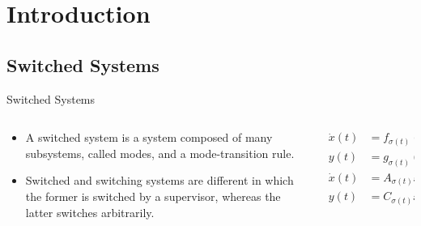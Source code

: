 
\section{Introduction}%
\label{sec:introduction}

\subsection{Switched Systems}%
\label{subsec:switched-systems}

\begin{slide}{Switched Systems}
  \begin{columns}[c]
    \begin{column}{0.48\textwidth}
      \begin{itemize}
        \item A switched system is a system composed of many subsystems, called
              modes, and a mode-transition rule.
        \item Switched and switching systems are different in which the former
              is switched by a supervisor, whereas the latter switches
              arbitrarily.
      \end{itemize}
    \end{column}%
    \hfill%
    \begin{column}{0.48\textwidth}
      \begin{equation}
        \begin{aligned}
          \dot{x}(t) & = f_{\sigma(t)}(t,x(t),u(t)), \\
          y(t)       & = g_{\sigma(t)}(t,x(t)),
        \end{aligned}
      \end{equation}
      \vspace*{0.5cm}
      \begin{equation}
        \begin{aligned}
          \dot{x}(t) & = A_{\sigma(t)}x(t) + B_{\sigma(t)}u(t), \\
          y(t)       & = C_{\sigma(t)}x(t) + D_{\sigma(t)}u(t).
        \end{aligned}
      \end{equation}
    \end{column}%
  \end{columns}
\end{slide}

